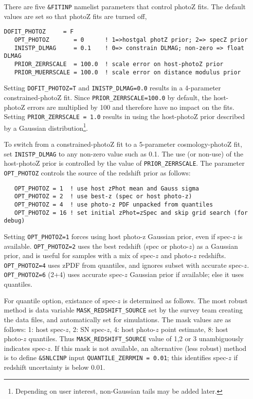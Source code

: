\documentclass[12pt]{article}
\begin{document}
There are five {\tt \&FITINP} namelist parameters that
control photoZ fits. The default values are set so
that photoZ fits are turned off,
%
\begin{Verbatim}[frame=single]
   DOFIT_PHOTOZ     = F
   OPT_PHOTOZ       = 0      ! 1=>hostgal photZ prior; 2=> specZ prior
   INISTP_DLMAG     = 0.1    ! 0=> constrain DLMAG; non-zero => float DLMAG
   PRIOR_ZERRSCALE  = 100.0  ! scale error on host-photoZ prior
   PRIOR_MUERRSCALE = 100.0  ! scale error on distance modulus prior
\end{Verbatim}
%
Setting {\tt DOFIT\_PHOTOZ=T} and {\tt INISTP\_DLMAG=0.0}
results in a 4-parameter constrained-photoZ fit.
Since {\tt PRIOR\_ZERRSCALE=100.0} by default, the host-photoZ
errors are multiplied by 100 and therefore have no impact on the fits.
Setting {\tt PRIOR\_ZERRSCALE = 1.0} results in using the 
host-photoZ prior described by a Gaussian 
distribution\footnote{Depending on user interest, 
non-Gaussian tails may be added later.}.


To switch from a constrained-photoZ fit to a 5-parameter
cosmology-photoZ fit, set {\tt INISTP\_DLMAG} to any
non-zero value such as 0.1. The use (or non-use) of the
host-photoZ prior is controlled by the value of 
{\tt PRIOR\_ZERRSCALE}.
The parameter {\tt OPT\_PHOTOZ} controls the source of
the redshift prior as follows:
%
\begin{verbatim}
   OPT_PHOTOZ = 1  ! use host zPhot mean and Gauss sigma
   OPT_PHOTOZ = 2  ! use best-z (spec or host photo-z) 
   OPT_PHOTOZ = 4  ! use photo-z PDF unpacked from quantiles
   OPT_PHOTOZ = 16 ! set initial zPhot=zSpec and skip grid search (for debug)
\end{verbatim}
%
Setting {\tt OPT\_PHOTOZ=1} forces using host photo-z Gaussian prior, 
even if spec-$z$ is available.
{\tt OPT\_PHOTOZ=2} uses the best redshift (spec or photo-$z$)
as a Gaussian prior, and is useful for samples with a mix of spec-$z$ and 
photo-$z$ redshifts.
%
{\tt OPT\_PHOTOZ=4} uses zPDF from quantiles, and ignores 
subset with accurate spec-$z$.
{\tt OPT\_PHOTOZ=6} (2+4) uses accurate spec-$z$ Gaussian prior
if available; else it uses quantiles.

For quantile option, existance of spec-$z$ is determined as follows.
The most robust method is data variable {\tt MASK\_REDSHIFT\_SOURCE}
set by the survey team creating the data files, and automatically
set for simulations. The mask values are as follows:
1: host spec-$z$, 2: SN spec-$z$, 4: host photo-$z$ point estimate, 
8: host photo-$z$ quantiles. Thus {\tt MASK\_REDSHIFT\_SOURCE} value
of 1,2 or 3 unambiguously indicates spec-$z$.
If this mask is not available, an alternative (less robust) method
is to define {\tt \&SNLCINP} input {\tt QUANTILE\_ZERRMIN = 0.01};
this identifies spec-$z$ if redshift uncertainty is below 0.01.
\end{document}
